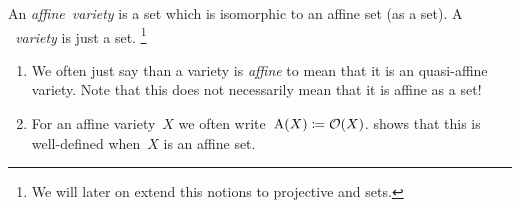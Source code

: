 \begin{definition}
  An \emph{affine~variety} is a {\qaffine} set which is isomorphic to an affine set (as a {\qaffine} set).
  A \emph{{\qaffine}~variety} is just a {\qaffine} set.%
  \footnote{We will later on extend this notions to projective and {\qprojective} sets.}
\end{definition}


\begin{notation}
  \leavevmode
  \begin{enumerate}
    \item
      We often just say than a {\qaffine} variety is \emph{affine} to mean that it is an quasi-affine variety.
      Note that this does not necessarily mean that it is affine as a set!
    \item
      For an affine variety~$X$ we often write~$\operatorname{A}(X) \coloneqq \mathcal{O}(X)$.
       shows that this is well-defined when~$X$ is an affine set.
  \end{enumerate}
\end{notation}



